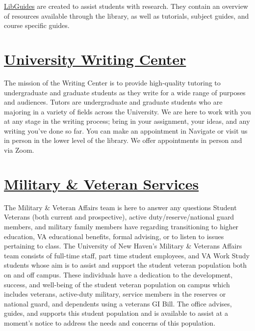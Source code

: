 \documentclass[11pt,]{article}
\begin{document}
\href{http://libguides.newhaven.edu/home}{LibGuides} are created to
assist students with research. They contain an overview of resources
available through the library, as well as tutorials, subject guides, and
course specific guides.

\hypertarget{university-writing-center}{%
\section{\texorpdfstring{\href{https://mycharger.newhaven.edu/web/mycharger/university-writing-center}{University
Writing
Center}}{University Writing Center}}\label{university-writing-center}}

The mission of the Writing Center is to provide high-quality tutoring to
undergraduate and graduate students as they write for a wide range of
purposes and audiences. Tutors are undergraduate and graduate students
who are majoring in a variety of fields across the University. We are
here to work with you at any stage in the writing process; bring in your
assignment, your ideas, and any writing you've done so far. You can make
an appointment in Navigate or visit us in person in the lower level of
the library. We offer appointments in person and via Zoom.

\hypertarget{military-veteran-services}{%
\section{\texorpdfstring{\href{https://www.newhaven.edu/veterans/}{Military
\& Veteran
Services}}{Military \& Veteran Services}}\label{military-veteran-services}}

The Military \& Veteran Affairs team is here to answer any questions
Student Veterans (both current and prospective), active
duty/reserve/national guard members, and military family members have
regarding transitioning to higher education, VA educational benefits,
formal advising, or to listen to issues pertaining to class. The
University of New Haven's Military \& Veterans Affairs team consists of
full-time staff, part time student employees, and VA Work Study students
whose aim is to assist and support the student veteran population both
on and off campus. These individuals have a dedication to the
development, success, and well-being of the student veteran population
on campus which includes veterans, active-duty military, service members
in the reserves or national guard, and dependents using a veterans GI
Bill. The office advises, guides, and supports this student population
and is available to assist at a moment's notice to address the needs and
concerns of this population.
\end{document}
